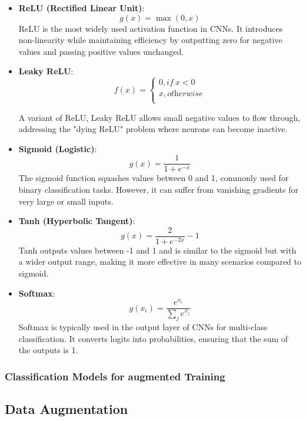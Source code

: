 \begin{itemize}
    \item \textbf{ReLU (Rectified Linear Unit)}:
    \[
    g(x) = \max(0, x)
    \]
    ReLU is the most widely used activation function in CNNs. It introduces non-linearity while maintaining efficiency by outputting zero for negative values and passing positive values unchanged.

    \item \textbf{Leaky ReLU}:
    \begin{equation} f(x) = \begin{cases} 0, \textit{if}\ x < 0 \\ x, \textit{otherwise} \\ \end{cases} \end{equation}

    A variant of ReLU, Leaky ReLU allows small negative values to flow through, addressing the "dying ReLU" problem where neurons can become inactive.

    \item \textbf{Sigmoid (Logistic)}:
    \[
    g(x) = \frac{1}{1 + e^{-x}}
    \]
    The sigmoid function squashes values between 0 and 1, commonly used for binary classification tasks. However, it can suffer from vanishing gradients for very large or small inputs.

    \item \textbf{Tanh (Hyperbolic Tangent)}:
    \[
    g(x) = \frac{2}{1 + e^{-2x}} - 1
    \]
    Tanh outputs values between -1 and 1 and is similar to the sigmoid but with a wider output range, making it more effective in many scenarios compared to sigmoid.

    \item \textbf{Softmax}:
    \[
    g(x_i) = \frac{e^{x_i}}{\sum_{j} e^{x_j}}
    \]
    Softmax is typically used in the output layer of CNNs for multi-class classification. It converts logits into probabilities, ensuring that the sum of the outputs is 1.
\end{itemize}



\subsubsection{Classification Models for augmented Training}

\subsection[Data Augmentation - DA]{Data Augmentation}\label{theoretical_da}

